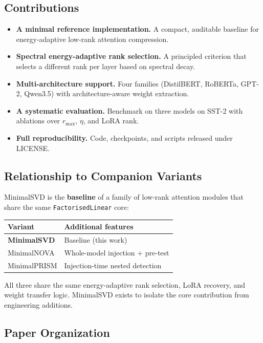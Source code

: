 \subsection{Contributions}

\begin{itemize}
\item \textbf{A minimal reference implementation.} A compact, auditable baseline for
  energy-adaptive low-rank attention compression.
\item \textbf{Spectral energy-adaptive rank selection.} A principled criterion that
  selects a different rank per layer based on spectral decay.
\item \textbf{Multi-architecture support.} Four families (DistilBERT, RoBERTa, GPT-2,
  Qwen3.5) with architecture-aware weight extraction.
\item \textbf{A systematic evaluation.} Benchmark on three models on SST-2 with
  ablations over $r_\text{max}$, $\eta$, and LoRA rank.
\item \textbf{Full reproducibility.} Code, checkpoints, and scripts released under
  {{LICENSE}}.

\end{itemize}
\subsection{Relationship to Companion Variants}

MinimalSVD is the \textbf{baseline} of a family of low-rank attention modules 
that share the same \texttt{FactorisedLinear} core:

\begin{table}[H]
\centering
\small
\begin{tabular}{ll}
\toprule
\textbf{Variant} & \textbf{Additional features} \\
\midrule
\textbf{MinimalSVD} & Baseline (this work) \\
MinimalNOVA & Whole-model injection + pre-test \\
MinimalPRISM & Injection-time nested detection \\
\bottomrule
\end{tabular}
\end{table}

All three share the same energy-adaptive rank selection, LoRA recovery, and 
weight transfer logic. MinimalSVD exists to isolate the core contribution 
from engineering additions.

\subsection{Paper Organization}

